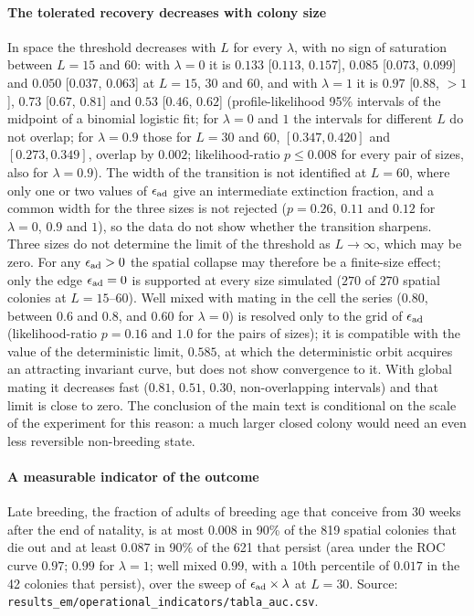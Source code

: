 \paragraph{The tolerated recovery decreases with colony size}
In space the threshold decreases with $L$ for every $\lambda$, with no sign of saturation between $L=15$ and $60$:
with $\lambda=0$ it is $0.133$ [$0.113$, $0.157$], $0.085$ [$0.073$, $0.099$] and $0.050$ [$0.037$, $0.063$] at $L=15$,
30 and 60, and with $\lambda=1$ it is $0.97$ [$0.88$, $>1$], $0.73$ [$0.67$, $0.81$] and $0.53$ [$0.46$, $0.62$]
(profile-likelihood 95\% intervals of the midpoint of a binomial logistic fit; for $\lambda=0$ and $1$ the intervals
for different $L$ do not overlap; for $\lambda=0.9$ those for $L=30$ and $60$, $[0.347, 0.420]$ and $[0.273, 0.349]$,
overlap by $0.002$; likelihood-ratio $p\le0.008$ for every pair of sizes, also for $\lambda=0.9$). The width of the transition is not
identified at $L=60$, where only one or two values of $\epsilon_{\rm ad}$ give an intermediate extinction fraction, and a
common width for the three sizes is not rejected ($p=0.26$, $0.11$ and $0.12$ for $\lambda=0$, $0.9$ and $1$), so the
data do not show whether the transition sharpens. Three sizes do not determine the limit of the threshold as
$L\to\infty$, which may be zero.
For any $\epsilon_{\rm ad}>0$ the spatial collapse may therefore be a finite-size effect; only the edge $\epsilon_{\rm ad}=0$ is
supported at every size simulated ($270$ of $270$ spatial colonies at $L=15$--$60$). Well mixed with mating in the
cell the series ($0.80$, between $0.6$ and $0.8$, and $0.60$ for $\lambda=0$) is resolved only to the grid of
$\epsilon_{\rm ad}$ (likelihood-ratio $p=0.16$ and $1.0$ for the pairs of sizes); it is compatible with the value of the
deterministic limit, $0.585$, at which the deterministic orbit acquires an attracting invariant curve, but does not
show convergence to it. With global mating it decreases fast ($0.81$, $0.51$, $0.30$, non-overlapping intervals) and
that limit is close to zero. The conclusion of the main text is
conditional on the scale of the experiment for this reason: a much larger closed colony would need an even less
reversible non-breeding state.

\paragraph{A measurable indicator of the outcome}
Late breeding, the fraction of adults of breeding age that conceive from 30 weeks after the end of natality, is at
most $0.008$ in 90\% of the 819 spatial colonies that die out and at least $0.087$ in 90\% of the 621 that persist
(area under the ROC curve $0.97$; $0.99$ for $\lambda=1$; well mixed $0.99$, with a 10th percentile of $0.017$ in the
42 colonies that persist), over the sweep of $\epsilon_{\rm ad}\times\lambda$ at $L=30$. Source:
\texttt{results\_em/operational\_indicators/tabla\_auc.csv}.

